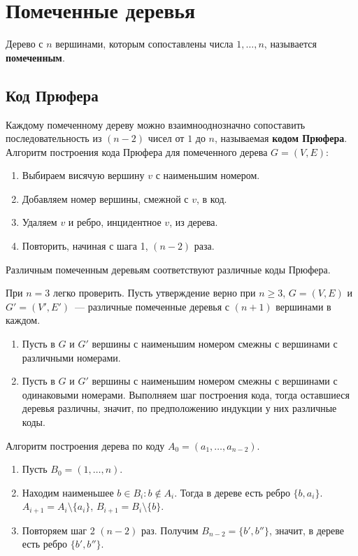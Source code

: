 \section{Помеченные деревья}
\begin{definition}
	Дерево с $n$ вершинами, которым сопоставлены числа $1, \ldots, n$, называется \textbf{помеченным}.
\end{definition}

\subsection{Код Прюфера}
	Каждому помеченному дереву можно взаимнооднозначно сопоставить последовательность из $(n - 2)$ чисел от $1$ до $n$, называемая \textbf{кодом Прюфера}. Алгоритм построения кода Прюфера для помеченного дерева $G = (V, E)$:
\begin{enumerate}
	\item Выбираем висячую вершину $v$ с наименьшим номером.
	\item Добавляем номер вершины, смежной с $v$, в код.
	\item Удаляем $v$ и ребро, инцидентное $v$, из дерева.
	\item Повторить, начиная с шага 1, $(n - 2)$ раза.
\end{enumerate}

\begin{statement}
	Различным помеченным деревьям соответствуют различные коды Прюфера.
\end{statement}
\begin{proofmathind}
	\indbase При $n = 3$ легко проверить.
	\indstep Пусть утверждение верно при $n \geqslant 3$, $G = (V, E)$ и $G' = (V', E')$~--- различные помеченные деревья с $(n + 1)$ вершинами в каждом.
	\begin{enumerate}
		\item Пусть в $G$ и $G'$ вершины с наименьшим номером смежны с вершинами с различными номерами.
		\item Пусть в $G$ и $G'$ вершины с наименьшим номером смежны с вершинами с одинаковыми номерами. Выполняем шаг построения кода, тогда оставшиеся деревья различны, значит, по предположению индукции у них различные коды.
	\end{enumerate}
	\indend
\end{proofmathind}

	Алгоритм построения дерева по коду $A_0 = (a_1, \ldots, a_{n-2})$.
\begin{enumerate}
	\item Пусть $B_0 = (1, \ldots, n)$.
	\item Находим наименьшее $b \in B_i \colon b \notin A_i$. Тогда в дереве есть ребро $\{ b, a_i \}$. $A_{i+1} = A_i \setminus \{ a_i \}$, $B_{i+1} = B_i \setminus \{ b \}$.
	\item Повторяем шаг 2 $(n - 2)$ раз. Получим $B_{n-2} = \{ b', b'' \}$, значит, в дереве есть ребро $\{ b', b'' \}$.
\end{enumerate}

